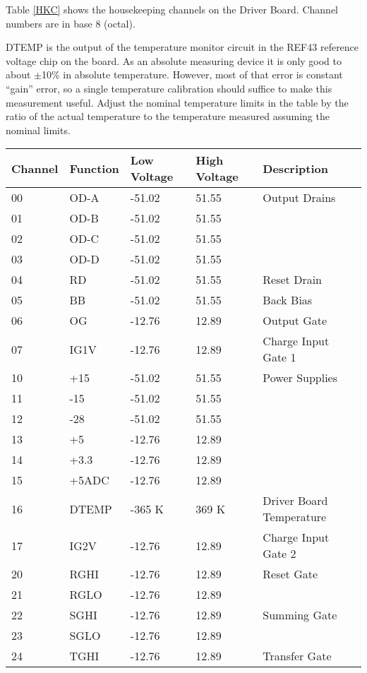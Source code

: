 Table \ref{HKC} shows the housekeeping channels on the Driver Board. Channel numbers are in base 8 (octal). 

DTEMP is the output of the temperature monitor circuit in the REF43 reference voltage chip on the board. As an absolute measuring device it is only good to about $\pm$10\% in absolute temperature. However, most of that error is constant ``gain'' error, so a single temperature calibration should suffice to make this measurement useful. Adjust the nominal temperature limits in the table by the ratio of the actual temperature to the temperature measured assuming the nominal limits.

\begin{table}[h]
\centering
\begin{tabular}{|l|l|l|l|l|}
\hline
Channel & Function & Low Voltage & High Voltage & Description\\
\hline
00 & OD-A & -51.02 & 51.55 & Output Drains \\
01 & OD-B & -51.02 & 51.55 &\\
02 & OD-C & -51.02 & 51.55& \\
03 & OD-D & -51.02 & 51.55& \\
\hline
04 & RD & -51.02 & 51.55 & Reset Drain\\
\hline
05 & BB & -51.02 & 51.55 & Back Bias \\
\hline
06 & OG &  -12.76 & 12.89& Output Gate \\
\hline
07 & IG1V & -12.76 & 12.89& Charge Input Gate 1\\
\hline
10 & +15 & -51.02 & 51.55 & Power Supplies\\
11 & -15 & -51.02 & 51.55 & \\
12 & -28 & -51.02 & 51.55 &\\
13 & +5 & -12.76 & 12.89&\\
14 & +3.3&  -12.76 & 12.89&\\
15 & +5ADC & -12.76 & 12.89& \\
\hline
16 & DTEMP & -365 K & 369 K & Driver Board Temperature\\
\hline
17 & IG2V &  -12.76 & 12.89& Charge Input Gate 2 \\
\hline
20 & RGHI & -12.76 & 12.89& Reset Gate\\
21 & RGLO & -12.76 & 12.89& \\
\hline
22 & SGHI & -12.76 & 12.89& Summing Gate \\
23 & SGLO & -12.76 & 12.89& \\
\hline
24 & TGHI & -12.76 & 12.89& Transfer Gate\\

\end{tabular}
\end{table}
